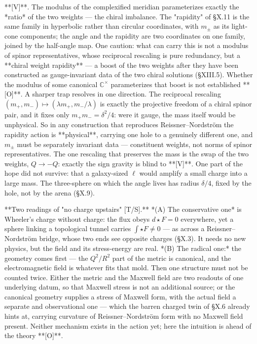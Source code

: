 **[V]**. The modulus of the complexified meridian parameterizes exactly the *ratio* of the two weights — the chiral imbalance. The "rapidity" of §X.11 is the same family in hyperbolic rather than circular coordinates, with $m_\pm$ as its light-cone components; the angle and the rapidity are two coordinates on one family, joined by the half-angle map. One caution: what can carry this is not a modulus of spinor representatives, whose reciprocal rescaling is pure redundancy, but a **chiral weight rapidity** — a boost of the two weights after they have been constructed as gauge-invariant data of the two chiral solutions (§XIII.5). Whether the modulus of some canonical $\mathbb{C}^\times$ parameterizes that boost is not established **[O]**. A sharper trap resolves in one direction. The reciprocal rescaling $(m_+,m_-)\mapsto(\lambda m_+,m_-/\lambda)$ is exactly the projective freedom of a chiral spinor pair, and it fixes only $m_+m_- = \delta^2/4$: were it gauge, the mass itself would be unphysical. So in any construction that reproduces Reissner–Nordström the rapidity action is **physical**, carrying one hole to a genuinely different one, and $m_\pm$ must be separately invariant data — constituent weights, not norms of spinor representatives. The one rescaling that preserves the mass is the swap of the two weights, $Q\to-Q$: exactly the sign gravity is blind to **[V]**. One part of the hope did not survive: that a galaxy-sized $\ell$ would amplify a small charge into a large mass. The three-sphere on which the angle lives has radius $\delta/4$, fixed by the hole, not by the arena (§X.9).

**Two readings of "no charge upstairs" [T/S].** *(A) The conservative one* is Wheeler's charge without charge: the flux obeys $d{\star}F = 0$ everywhere, yet a sphere linking a topological tunnel carries $\int{\star}F\neq0$ — as across a Reissner–Nordström bridge, whose two ends see opposite charges (§X.3). It needs no new physics, but the field and its stress-energy are real. *(B) The radical one:* the geometry comes first — the $Q^2/R^2$ part of the metric is canonical, and the electromagnetic field is whatever fits that mold. Then one structure must not be counted twice. Either the metric and the Maxwell field are two readouts of one underlying datum, so that Maxwell stress is not an additional source; or the canonical geometry supplies a stress of Maxwell form, with the actual field a separate and observational one — which the barren charged twin of §X.6 already hints at, carrying curvature of Reissner–Nordström form with no Maxwell field present. Neither mechanism exists in the action yet; here the intuition is ahead of the theory **[O]**.

